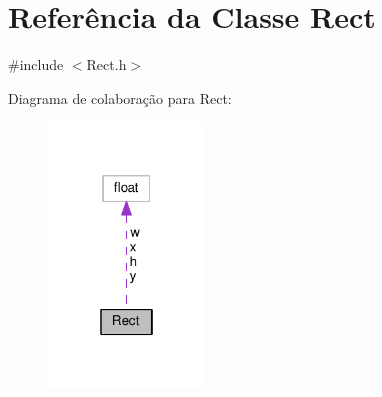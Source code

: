 \hypertarget{classRect}{\section{Referência da Classe Rect}
\label{classRect}
}


{\ttfamily \#include $<$Rect.\+h$>$}



Diagrama de colaboração para Rect\+:\nopagebreak
\begin{figure}[H]
\begin{center}
\leavevmode
\includegraphics[width=118pt]{classRect__coll__graph}
\end{center}
\end{figure}

